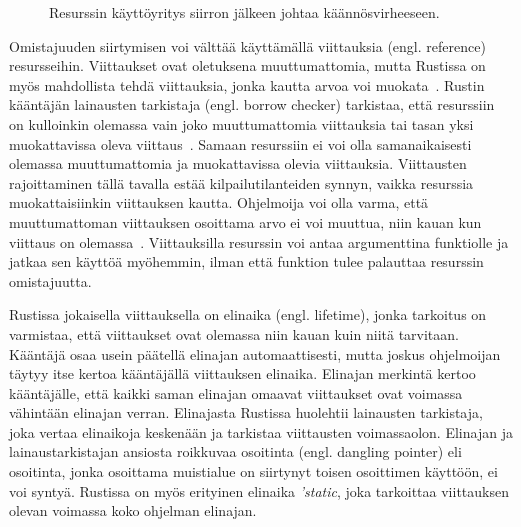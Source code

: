 \begin{minipage}{\linewidth}

\end{minipage}

\begin{figure}[h]
  \caption{Resurssin käyttöyritys siirron jälkeen johtaa käännösvirheeseen.}
  \label{rust_move_image}
\end{figure}

Omistajuuden siirtymisen voi välttää käyttämällä viittauksia (engl. reference) resursseihin. Viittaukset ovat oletuksena muuttumattomia, mutta Rustissa on myös mahdollista tehdä viittauksia, jonka kautta arvoa voi muokata~\cite[p.~147]{10.1145/3418295}. Rustin kääntäjän lainausten tarkistaja (engl. borrow checker) tarkistaa, että resurssiin on kulloinkin olemassa vain joko muuttumattomia viittauksia tai tasan yksi muokattavissa oleva viittaus~\cite[chapter~4.2]{rustbook}. Samaan resurssiin ei voi olla samanaikaisesti olemassa muuttumattomia ja muokattavissa olevia viittauksia. Viittausten rajoittaminen tällä tavalla estää kilpailutilanteiden synnyn, vaikka resurssia muokattaisiinkin viittauksen kautta. Ohjelmoija voi olla varma, että muuttumattoman viittauksen osoittama arvo ei voi muuttua, niin kauan kun viittaus on olemassa~\cite[chapter~4.2]{rustbook}. Viittauksilla resurssin voi antaa argumenttina funktiolle ja jatkaa sen käyttöä myöhemmin, ilman että funktion tulee palauttaa resurssin omistajuutta.

Rustissa jokaisella viittauksella on elinaika (engl. lifetime), jonka tarkoitus on varmistaa, että viittaukset ovat olemassa niin kauan kuin niitä tarvitaan. Kääntäjä osaa usein päätellä elinajan automaattisesti, mutta joskus ohjelmoijan täytyy itse kertoa kääntäjällä viittauksen elinaika. Elinajan merkintä kertoo kääntäjälle, että kaikki saman elinajan omaavat viittaukset ovat voimassa vähintään elinajan verran. Elinajasta Rustissa huolehtii lainausten tarkistaja, joka vertaa elinaikoja keskenään ja tarkistaa viittausten voimassaolon. Elinajan ja lainaustarkistajan ansiosta roikkuvaa osoitinta (engl. dangling pointer) eli osoitinta, jonka osoittama muistialue on siirtynyt toisen osoittimen käyttöön, ei voi syntyä. Rustissa on myös erityinen elinaika \textit{'static}, joka tarkoittaa viittauksen olevan voimassa koko ohjelman elinajan.~\cite[chapter~10.3]{rustbook}


